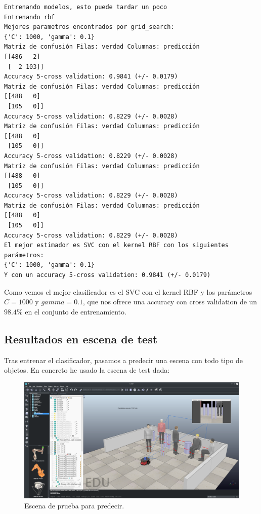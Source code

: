 \documentclass[12pt, spanish]{article}
\begin{document}
\begin{lstlisting}
Entrenando modelos, esto puede tardar un poco
Entrenando rbf
Mejores parametros encontrados por grid_search:
{'C': 1000, 'gamma': 0.1}
Matriz de confusión Filas: verdad Columnas: predicción
[[486   2]
 [  2 103]]
Accuracy 5-cross validation: 0.9841 (+/- 0.0179)
Matriz de confusión Filas: verdad Columnas: predicción
[[488   0]
 [105   0]]
Accuracy 5-cross validation: 0.8229 (+/- 0.0028)
Matriz de confusión Filas: verdad Columnas: predicción
[[488   0]
 [105   0]]
Accuracy 5-cross validation: 0.8229 (+/- 0.0028)
Matriz de confusión Filas: verdad Columnas: predicción
[[488   0]
 [105   0]]
Accuracy 5-cross validation: 0.8229 (+/- 0.0028)
Matriz de confusión Filas: verdad Columnas: predicción
[[488   0]
 [105   0]]
Accuracy 5-cross validation: 0.8229 (+/- 0.0028)
El mejor estimador es SVC con el kernel RBF con los siguientes parámetros: 
{'C': 1000, 'gamma': 0.1}
Y con un accuracy 5-cross validation: 0.9841 (+/- 0.0179)
\end{lstlisting}

Como vemos el mejor clasificador es el SVC con el kernel RBF y los parámetros $C = 1000$ y $gamma = 0.1$, que nos ofrece una accuracy con cross validation de un $98.4\%$ en el conjunto de entrenamiento.

\subsection{Resultados en escena de test}

Tras entrenar el clasificador, pasamos a predecir una escena con todo tipo de objetos. En concreto he usado la escena de test dada:

\begin{figure}[H]
    \centering
    \includegraphics[width=\textwidth]{escena_test.png}
    \caption{Escena de prueba para predecir.}
\end{figure}
\end{document}
